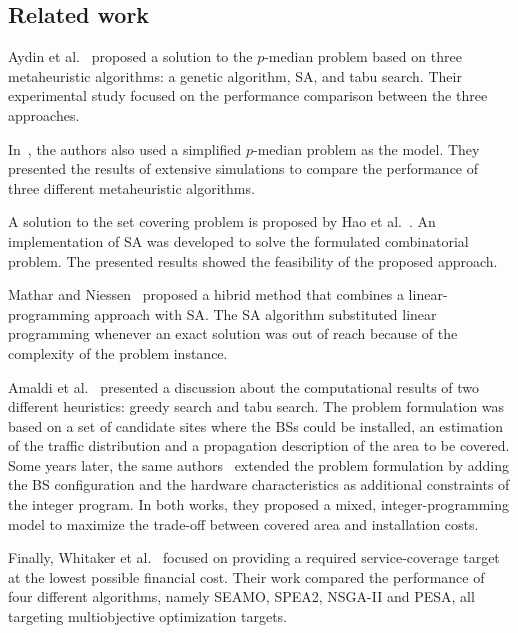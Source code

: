 \subsection{Related work}

Aydin et al.~\cite{Aydin:Heuristic.Optimization.Of.WCDMA} proposed
a solution to the $p$-median problem based on three metaheuristic
algorithms: a genetic algorithm, SA, and tabu search. Their experimental
study focused on the performance comparison between the three approaches.

In~\cite{Yang-UMTS_base_station_location_planning:2007}, the authors
also used a simplified $p$-median problem as the model. They presented
the results of extensive simulations to compare the performance of
three different metaheuristic algorithms.

A solution to the set covering problem is proposed by Hao et al.~\cite{minimum.set.covering.problem:1997}.
An implementation of SA was developed to solve the formulated combinatorial
problem. The presented results showed the feasibility of the proposed
approach. 

Mathar and Niessen~\cite{minimum.set.covering.problem:2000} proposed
a hibrid method that combines a linear-programming approach with SA.
The SA algorithm substituted linear programming whenever an exact
solution was out of reach because of the complexity of the problem
instance.

Amaldi et al.~\cite{Amaldi-Planning_UMTS_base_station_locations:2003}
presented a discussion about the computational results of two different
heuristics: greedy search and tabu search. The problem formulation
was based on a set of candidate sites where the BSs could be installed,
an estimation of the traffic distribution and a propagation description
of the area to be covered. Some years later, the same authors~\cite{Amaldi-Radio_planning_and_coverage_optimization_of_3G_networks:2008}
extended the problem formulation by adding the BS configuration and
the hardware characteristics as additional constraints of the integer
program. In both works, they proposed a mixed, integer-programming
model to maximize the trade-off between covered area and installation
costs.

Finally, Whitaker et al.~\cite{GA.for.antenna.placement:2005} focused
on providing a required service-coverage target at the lowest possible
financial cost. Their work compared the performance of four different
algorithms, namely SEAMO, SPEA2, NSGA-II and PESA, all targeting multiobjective
optimization targets.


